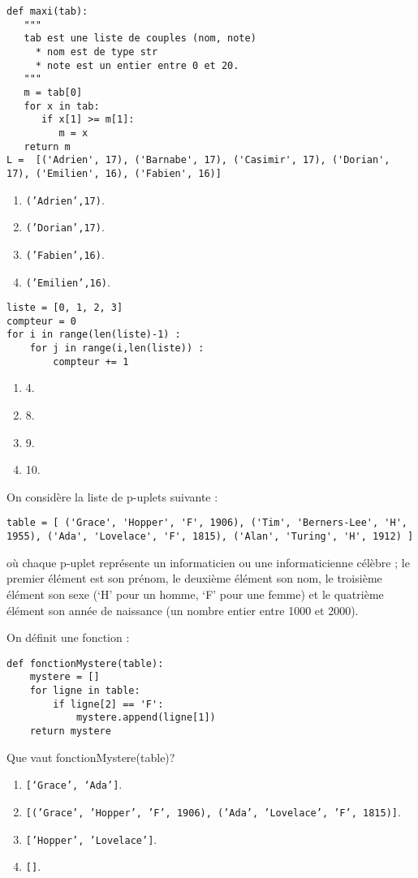 \begin{lstlisting}
def maxi(tab):
   """
   tab est une liste de couples (nom, note)
     * nom est de type str
     * note est un entier entre 0 et 20.
   """
   m = tab[0]
   for x in tab:
      if x[1] >= m[1]:
         m = x
   return m
L =  [('Adrien', 17), ('Barnabe', 17), ('Casimir', 17), ('Dorian', 17), ('Emilien', 16), ('Fabien', 16)]
\end{lstlisting}
\begin{enumerate}
\item \texttt{('Adrien',17)}.
\item \texttt{('Dorian',17)}. %
\item \texttt{('Fabien',16)}.
\item \texttt{('Emilien',16)}.
\end{enumerate}


\begin{lstlisting}
liste = [0, 1, 2, 3]
compteur = 0
for i in range(len(liste)-1) :
    for j in range(i,len(liste)) :
        compteur += 1
\end{lstlisting}
\begin{enumerate}
\item 4.
\item 8.
\item 9. %
\item 10.
\end{enumerate}

\question{}
On considère la liste de p-uplets suivante :
\begin{lstlisting}
table = [ ('Grace', 'Hopper', 'F', 1906), ('Tim', 'Berners-Lee', 'H', 1955), ('Ada', 'Lovelace', 'F', 1815), ('Alan', 'Turing', 'H', 1912) ]
\end{lstlisting}
où chaque p-uplet représente un informaticien ou une informaticienne célèbre ; le premier élément est son prénom, le deuxième élément son nom, le troisième élément son sexe (‘H’ pour un homme, ‘F’ pour une femme) et le quatrième élément son année de naissance (un nombre entier entre 1000 et 2000).

On définit une fonction :
\begin{lstlisting}
def fonctionMystere(table):
    mystere = []
    for ligne in table:
        if ligne[2] == 'F':
            mystere.append(ligne[1])
    return mystere
\end{lstlisting}
Que vaut fonctionMystere(table)?
\begin{enumerate}
\item \texttt{[‘Grace’, ‘Ada’]}.
\item \texttt{[('Grace', 'Hopper', 'F', 1906), ('Ada', 'Lovelace', 'F', 1815)]}.
\item \texttt{['Hopper', 'Lovelace']}. %
\item \texttt{[]}.
\end{enumerate}

